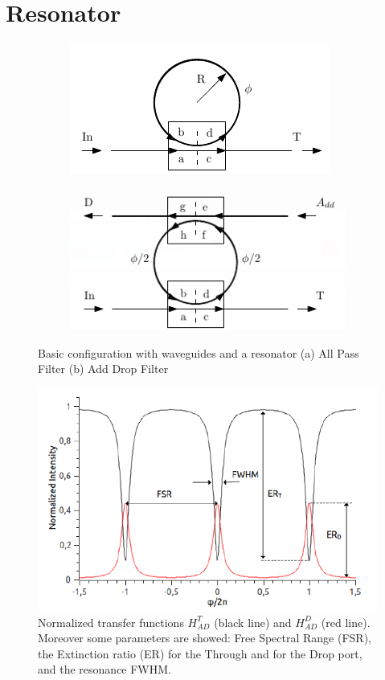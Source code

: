 \section{Resonator}
\begin{figure}
\centering
\begin{subfigure}{0.5\textwidth}
\centering
\includegraphics[width = \textwidth]{img/APF}
\caption{}
\end{subfigure}%
\begin{subfigure}{0.5\textwidth}
\includegraphics[width = \textwidth]{img/ADF}
\caption{}
\end{subfigure}
\caption{Basic configuration with waveguides and a resonator (a) All Pass Filter (b) Add Drop Filter}\label{basicconfiguration}
\end{figure}

\begin{figure}
\centering
\includegraphics[width = .7\textwidth]{img/transferfunction}
\caption{Normalized transfer functions $H^T_{AD}$ (black line) and $H^D_{AD}$ (red line). Moreover some parameters are showed: Free Spectral Range (FSR), the Extinction ratio (ER) for the Through and for the Drop port, and the resonance FWHM.}\label{transfer}
\end{figure}

